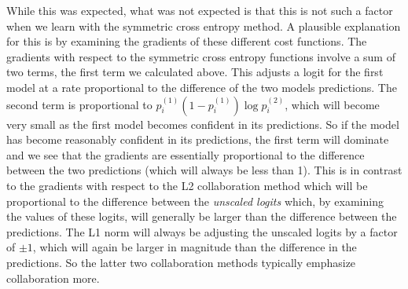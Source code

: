 \documentclass[english,a4paper,oneside]{amsart}
\theoremstyle{definition}
\begin{document}
While this was expected, what was not expected is that this is not such a factor when we learn with the symmetric cross entropy method.  A plausible explanation for this is by examining the gradients of these different cost functions. The gradients with respect to the symmetric cross entropy functions involve a sum of two terms, the first term we calculated above. This adjusts a logit for the first model at a rate proportional to the difference of the two models predictions. The second term is proportional to $p_i^{(1)}(1-p_i^{(1)})\log p_i^{(2)}$, which will become very small as the first model becomes confident in its predictions. So if the model has become reasonably confident in its predictions, the first term will dominate and we see that the gradients are essentially proportional to the difference between the two predictions (which will always be less than 1). This is in contrast to the gradients with respect to the L2 collaboration method which will be proportional to the difference between the \emph{unscaled logits} which, by examining the values of these logits, will generally be larger than the difference between the predictions. The L1 norm will always be adjusting the unscaled logits by a factor of $\pm 1$, which will again be larger in magnitude than the difference in the predictions. So the latter two collaboration methods typically emphasize collaboration more.
\end{document}

